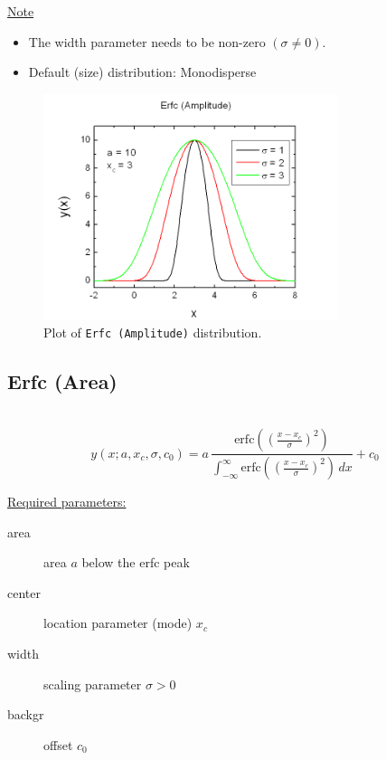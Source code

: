 \underline{Note}
\begin{itemize}
  \item The width parameter needs to be non-zero $(\sigma\neq 0)$.
  \item Default (size) distribution: Monodisperse
\end{itemize}
\begin{figure}[htb]
\begin{center}
\includegraphics[width=0.768\textwidth]{ErfcAmplitude.png}
\end{center}
\caption{Plot of \texttt{Erfc (Amplitude)} distribution.}
\label{fig:ErfcAmplitude}
\end{figure}

\clearpage
\subsection{Erfc (Area)} ~\\
\label{sec:ErfcPeakArea}
\begin{equation}
y(x;a,x_c,\sigma,c_0) = a\, \frac{\textrm{erfc}\left(\left(\frac{x-x_c}{\sigma}\right)^2\right)}{
\int_{-\infty}^{\infty}\textrm{erfc}\left(\left(\frac{x-x_c}{\sigma}\right)^2\right) \, dx}
+c_0
\end{equation}
\vspace{5mm}

\underline{Required parameters:}
\begin{description}
    \item[area] area $a$ below the erfc peak
    \item[center] location parameter (mode) $x_c$
    \item[width] scaling parameter $\sigma>0$
    \item[backgr] offset $c_0$
\end{description}

